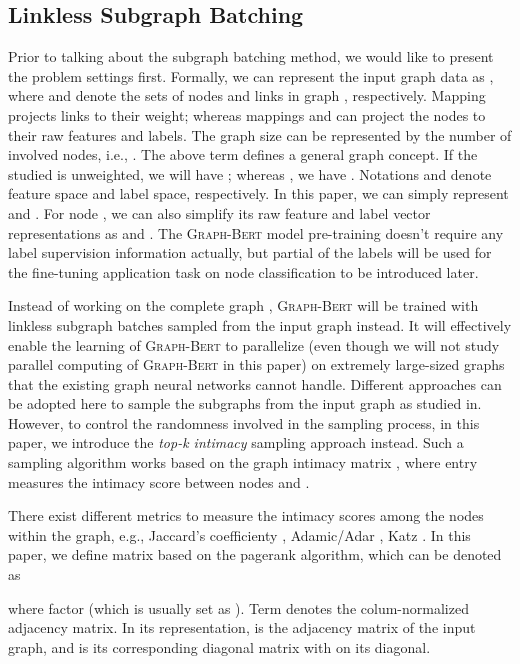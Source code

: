 \documentclass{article}
\newcommand{\our}{\textsc{Graph-Bert}}
\begin{document}
\subsection{Linkless Subgraph Batching}\label{subsec:sampling}

Prior to talking about the subgraph batching method, we would like to present the problem settings first. Formally, we can represent the input graph data as , where  and  denote the sets of nodes and links in graph , respectively. Mapping  projects links to their weight; whereas mappings  and  can project the nodes to their raw features and labels. The graph size can be represented by the number of involved nodes, i.e., . The above term defines a general graph concept. If the studied  is unweighted, we will have ; whereas , we have . Notations  and  denote feature space and label space, respectively. In this paper, we can simply represent  and . For node , we can also simplify its raw feature and label vector representations as  and . The {\our} model pre-training doesn't require any label supervision information actually, but partial of the labels will be used for the fine-tuning application task on node classification to be introduced later.

Instead of working on the complete graph , {\our} will be trained with linkless subgraph batches sampled from the input graph instead. It will effectively enable the learning of {\our} to parallelize (even though we will not study parallel computing of {\our} in this paper) on extremely large-sized graphs that the existing graph neural networks cannot handle. Different approaches can be adopted here to sample the subgraphs from the input graph as studied in\cite{ZCG18}. However, to control the randomness involved in the sampling process, in this paper, we introduce the \textit{top-k intimacy} sampling approach instead. Such a sampling algorithm works based on the graph intimacy matrix , where entry  measures the intimacy score between nodes  and .

There exist different metrics to measure the intimacy scores among the nodes within the graph, e.g., Jaccard's coefficienty \cite{jaccard1901etude}, Adamic/Adar \cite{adamic2003friends}, Katz \cite{Katz1953}. In this paper, we define matrix  based on the pagerank algorithm, which can be denoted as

where factor  (which is usually set as ). Term  denotes the colum-normalized adjacency matrix. In its representation,  is the adjacency matrix of the input graph, and  is its corresponding diagonal matrix with  on its diagonal. 
\end{document}

